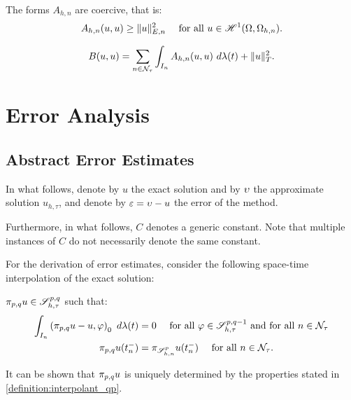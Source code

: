 \begin{lemma}[Coercivity of $A_{h, n}$]
    The forms $A_{h, n}$ are coercive, that is:
    \begin{gather}
        A_{h, n}(u, u) \geq \lVert u \rVert_{E, n}^2 \quad \text{ for all } u \in \mathscr{H}^{1}(\Omega, \Omega_{h, n}).
    \end{gather}
\end{lemma}

\begin{lemma}[Coercivity of $B$]
    \begin{gather}
        B(u, u) = \sum_{n \in \mathcal{N}_{\tau}} \int_{I_n} A_{h, n}(u, u) ~ d \lambda(t) + \lVert u \rVert_{T}^2.
    \end{gather}
\end{lemma}

\newpage
\section{Error Analysis}

\subsection{Abstract Error Estimates}

In what follows, denote by $u$ the exact solution and by $\upsilon$ the approximate solution $u_{h, \tau}$, and denote by $\varepsilon = \upsilon - u$ the error of the method.

Furthermore, in what follows, $C$ denotes a generic constant. Note that multiple instances of $C$ do not necessarily denote the same constant.

For the derivation of error estimates, consider the following space-time interpolation of the exact solution:

\begin{definition}[$\IntU$] \label{definition:interpolant_qp}
    $\pi_{p, q} u \in \mathscr{S}^{p, q}_{h, \tau}$ such that:
    \begin{align}
        \int_{I_n} \left( \pi_{p, q} u - u, \varphi \right)_0 ~ d \lambda(t) &= 0 \quad \text{ for all } \varphi \in \mathscr{S}^{p, q - 1}_{h, \tau} \text{ and for all } n \in \mathcal{N}_{\tau} \\
        \pi_{p, q} u(t_n^-) &= \pi_{\mathscr{S}^p_{h, n}} u(t_n^-) \quad \text{ for all } n \in \mathcal{N}_{\tau}.
    \end{align}
\end{definition}

It can be shown that $\IntU$ is uniquely determined by the properties stated in \cref{definition:interpolant_qp}.

